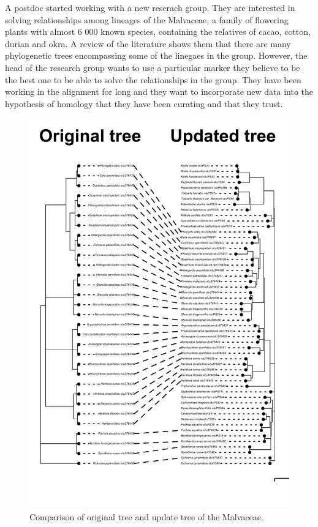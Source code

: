 \documentclass[]{article}
\begin{document}
A postdoc started working with a new reserach group. They are interested in solving relationships among lineages of the Malvaceae, a family of flowering plants with almost 6 000 known species, containing the relatives of cacao, cotton, durian and okra.
A review of the literature shows them that there are many phylogenetic trees encompassing some of the linegaes in the group. However, the head of the research group wants to use a particular marker they believe to be the best one to be able to solve the relationships in the group. They have been working in the alignment for long and they want to incorporate new data into the hypothesis of homology that they have been curating and that they trust.

\begin{figure}

{\centering \includegraphics[width=0.85\linewidth]{docs/figs/cotree-plot2-1} 

}

\caption{Comparison of original tree and update tree of the Malvaceae.}\label{fig:fig-2}
\end{figure}
\newpage
\end{document}
